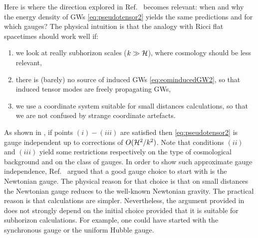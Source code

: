 \documentclass[a4paper,11pt]{article}
\numberwithin{equation}{section}
\begin{document}
Here is where the direction explored in Ref.~\cite{Domenech:2020xin} becomes relevant: when and why the energy density of GWs \eqref{eq:pseudotensor2} yields the same predictions and for which gauges? The physical intuition is that the analogy with Ricci flat spacetimes should work well if: 
\begin{enumerate}[label=\textit{(\roman*)}]
\item we look at really subhorizon scales ($k\gg {\cal H}$), where cosmology should be less relevant,
\item there is (barely) no source of induced GWs \eqref{eq:eominducedGW2}, so that induced tensor modes are freely propagating GWs,
\item we use a coordinate system suitable for small distances calculations, so that we are not confused by strange coordinate artefacts.
\end{enumerate}
As shown in \cite{Domenech:2020xin}, if points $(i)-(iii)$ are satisfied then \eqref{eq:pseudotensor2} is gauge independent up to corrections of $O({\cal H}^2/k^2)$. Note that conditions $(ii)$ and $(iii)$ yield some restrictions respectively on the type of cosmological background and on the class of gauges. In order to show such approximate gauge independence, Ref.~\cite{Domenech:2020xin} argued that a good gauge choice to start with is the Newtonian gauge. The physical reason for that choice is that on small distances the Newtonian gauge reduces to the well-known Newtonian gravity. The practical reason is that calculations are simpler. Nevertheless, the argument provided in \cite{Domenech:2020xin} does not strongly depend on the initial choice provided that it is suitable for subhorizon calculations. For example, one could have started with the synchronous gauge or the uniform Hubble gauge. 
\end{document}
